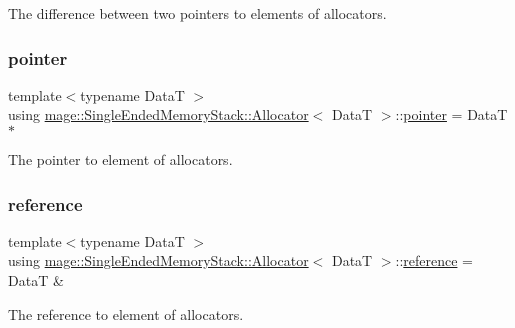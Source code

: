The difference between two pointers to elements of allocators. \hypertarget{structmage_1_1_single_ended_memory_stack_1_1_allocator_a2bc2a84329210a698f0e0bf76da88af3}{}\label{structmage_1_1_single_ended_memory_stack_1_1_allocator_a2bc2a84329210a698f0e0bf76da88af3} 
\subsubsection{\texorpdfstring{pointer}{pointer}}
{\footnotesize\ttfamily template$<$typename DataT $>$ \\
using \hyperlink{structmage_1_1_single_ended_memory_stack_1_1_allocator}{mage\+::\+Single\+Ended\+Memory\+Stack\+::\+Allocator}$<$ DataT $>$\+::\hyperlink{structmage_1_1_single_ended_memory_stack_1_1_allocator_a2bc2a84329210a698f0e0bf76da88af3}{pointer} =  DataT $\ast$}

The pointer to element of allocators. \hypertarget{structmage_1_1_single_ended_memory_stack_1_1_allocator_a85ce7171363682bb03ec7b8ad5980b24}{}\label{structmage_1_1_single_ended_memory_stack_1_1_allocator_a85ce7171363682bb03ec7b8ad5980b24} 
\subsubsection{\texorpdfstring{reference}{reference}}
{\footnotesize\ttfamily template$<$typename DataT $>$ \\
using \hyperlink{structmage_1_1_single_ended_memory_stack_1_1_allocator}{mage\+::\+Single\+Ended\+Memory\+Stack\+::\+Allocator}$<$ DataT $>$\+::\hyperlink{structmage_1_1_single_ended_memory_stack_1_1_allocator_a85ce7171363682bb03ec7b8ad5980b24}{reference} =  DataT \&}

The reference to element of allocators. \hypertarget{structmage_1_1_single_ended_memory_stack_1_1_allocator_af04b72c8781cfb7148d8f0d4b0da41c3}{}\label{structmage_1_1_single_ended_memory_stack_1_1_allocator_af04b72c8781cfb7148d8f0d4b0da41c3} 
